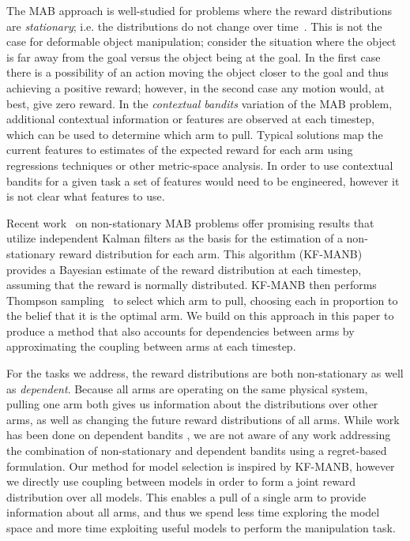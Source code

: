 The MAB approach is well-studied for problems where the reward distributions are \textit{stationary}; i.e. the distributions do not change over time~\cite{Auer2002, Agrawal2012}. This is not the case for deformable object manipulation; consider the situation where the object is far away from the goal versus the object being at the goal. In the first case there is a possibility of an action moving the object closer to the goal and thus achieving a positive reward; however, in the second case any motion would, at best, give zero reward. In the \textit{contextual bandits} \cite{Langford2008, Slivkins2014} variation of the MAB problem, additional contextual information or features are observed at each timestep, which can be used to determine which arm to pull. Typical solutions map the current features to estimates of the expected reward for each arm using regressions techniques or other metric-space analysis. In order to use contextual bandits for a given task a set of features would need to be engineered, however it is not clear what features to use.

Recent work~\cite{Granmo2010} on non-stationary MAB problems offer promising results that utilize independent Kalman filters as the basis for the estimation of a non-stationary reward distribution for each arm. This algorithm (KF-MANB) provides a Bayesian estimate of the reward distribution at each timestep, assuming that the reward is normally distributed. KF-MANB then performs Thompson sampling~\cite{Agrawal2012} to select which arm to pull, choosing each in proportion to the belief that it is the optimal arm. We build on this approach in this paper to produce a method that also accounts for dependencies between arms by approximating the coupling between arms at each timestep.

For the tasks we address, the reward distributions are both non-stationary as well as \textit{dependent}. Because all arms are operating on the same physical system, pulling one arm both gives us information about the distributions over other arms, as well as changing the future reward distributions of all arms. While work has been done on dependent bandits \cite{Pandey2007, Langford2008}, we are not aware of any work addressing the combination of non-stationary and dependent bandits using a regret-based formulation. Our method for model selection is inspired by KF-MANB, however we directly use coupling between models in order to form a joint reward distribution over all models. This enables a pull of a single arm to provide information about all arms, and thus we spend less time exploring the model space and more time exploiting useful models to perform the manipulation task.

